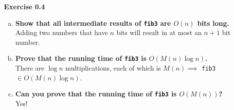 \documentclass{article}
\newenvironment{problem}[2][Exercise]
    { \begin{mdframed}[backgroundcolor=gray!20] \textbf{#1 #2} \\}
    {  \end{mdframed}}
\begin{document}
\begin{problem}{0.4}
\begin{enumerate}[(a)]
    \item \textbf{Show that all intermediate results of \texttt{fib3} are $O(n)$ bits long.}
    \\
    Adding two numbers that have $n$ bits will result in at most an $n+1$ bit number.

    \item \textbf{Prove that the running time of \texttt{fib3} is $O(M(n)\log n)$.}
    \\
    There are $\log n$ multiplications, each of which is $M(n)\implies$ \texttt{fib3} $\in O(M(n)\log n)$.

    \item \textbf{Can you prove that the running time of \texttt{fib3} is $O(M(n))$?}
    \\
    Yes!
    \end{enumerate}
\end{problem}
\end{document}

